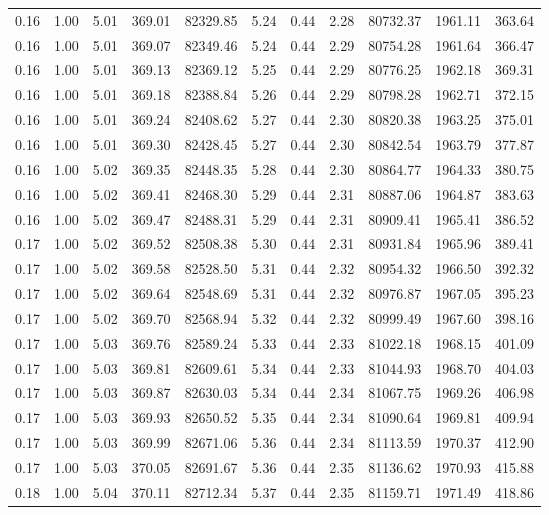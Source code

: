 \begin{table}[!ht]
\begin{tabular}{rrrrrrrrrrr}
0.16 & 1.00 & 5.01 & 369.01 & 82329.85 & 5.24 & 0.44 & 2.28 & 80732.37 & 1961.11 & 363.64 \\
0.16 & 1.00 & 5.01 & 369.07 & 82349.46 & 5.24 & 0.44 & 2.29 & 80754.28 & 1961.64 & 366.47 \\
0.16 & 1.00 & 5.01 & 369.13 & 82369.12 & 5.25 & 0.44 & 2.29 & 80776.25 & 1962.18 & 369.31 \\
0.16 & 1.00 & 5.01 & 369.18 & 82388.84 & 5.26 & 0.44 & 2.29 & 80798.28 & 1962.71 & 372.15 \\
0.16 & 1.00 & 5.01 & 369.24 & 82408.62 & 5.27 & 0.44 & 2.30 & 80820.38 & 1963.25 & 375.01 \\
0.16 & 1.00 & 5.01 & 369.30 & 82428.45 & 5.27 & 0.44 & 2.30 & 80842.54 & 1963.79 & 377.87 \\
0.16 & 1.00 & 5.02 & 369.35 & 82448.35 & 5.28 & 0.44 & 2.30 & 80864.77 & 1964.33 & 380.75 \\
0.16 & 1.00 & 5.02 & 369.41 & 82468.30 & 5.29 & 0.44 & 2.31 & 80887.06 & 1964.87 & 383.63 \\
0.16 & 1.00 & 5.02 & 369.47 & 82488.31 & 5.29 & 0.44 & 2.31 & 80909.41 & 1965.41 & 386.52 \\
0.17 & 1.00 & 5.02 & 369.52 & 82508.38 & 5.30 & 0.44 & 2.31 & 80931.84 & 1965.96 & 389.41 \\
0.17 & 1.00 & 5.02 & 369.58 & 82528.50 & 5.31 & 0.44 & 2.32 & 80954.32 & 1966.50 & 392.32 \\
0.17 & 1.00 & 5.02 & 369.64 & 82548.69 & 5.31 & 0.44 & 2.32 & 80976.87 & 1967.05 & 395.23 \\
0.17 & 1.00 & 5.02 & 369.70 & 82568.94 & 5.32 & 0.44 & 2.32 & 80999.49 & 1967.60 & 398.16 \\
0.17 & 1.00 & 5.03 & 369.76 & 82589.24 & 5.33 & 0.44 & 2.33 & 81022.18 & 1968.15 & 401.09 \\
0.17 & 1.00 & 5.03 & 369.81 & 82609.61 & 5.34 & 0.44 & 2.33 & 81044.93 & 1968.70 & 404.03 \\
0.17 & 1.00 & 5.03 & 369.87 & 82630.03 & 5.34 & 0.44 & 2.34 & 81067.75 & 1969.26 & 406.98 \\
0.17 & 1.00 & 5.03 & 369.93 & 82650.52 & 5.35 & 0.44 & 2.34 & 81090.64 & 1969.81 & 409.94 \\
0.17 & 1.00 & 5.03 & 369.99 & 82671.06 & 5.36 & 0.44 & 2.34 & 81113.59 & 1970.37 & 412.90 \\
0.17 & 1.00 & 5.03 & 370.05 & 82691.67 & 5.36 & 0.44 & 2.35 & 81136.62 & 1970.93 & 415.88 \\
0.18 & 1.00 & 5.04 & 370.11 & 82712.34 & 5.37 & 0.44 & 2.35 & 81159.71 & 1971.49 & 418.86 \\

\end{tabular}
\end{table}
